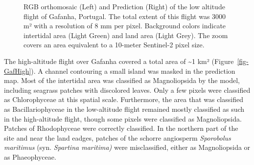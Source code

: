 \documentclass[
  number]{elsarticle}
\begin{document}
\label{cell-fig-GafLow}
\begin{figure}[H]


\caption{\label{fig-GafLow}RGB orthomosaic (Left) and Prediction (Right)
of the low altitude flight of Gafanha, Portugal. The total extent of
this flight was 3000 m² with a resolution of 8 mm per pixel. Background
colors indicate intertidal area (Light Green) and land area (Light
Grey). The zoom covers an area equivalent to a 10-meter Sentinel-2 pixel
size.}

\end{figure}%

The high-altitude flight over Gafanha covered a total area of
\textasciitilde1 km² (Figure~\ref{fig-GafHigh}). A channel contouring a
small island was masked in the prediction map. Most of the intertidal
area was classified as Magnoliopsida by the model, including seagrass
patches with discolored leaves. Only a few pixels were classified as
Chlorophyceae at this spatial scale. Furthermore, the area that was
classified as Bacillariophyceae in the low-altitude flight remained
mostly classified as such in the high-altitude flight, though some
pixels were classified as Magnoliopsida. Patches of Rhodophyceae were
correctly classified. In the northern part of the site and near the land
eadges, patches of the schorre angiosperm \emph{Sporobolus maritimus}
(syn. \emph{Spartina maritima)} were misclassified, either as
Magnoliopsida or as Phaeophyceae.
\end{document}
